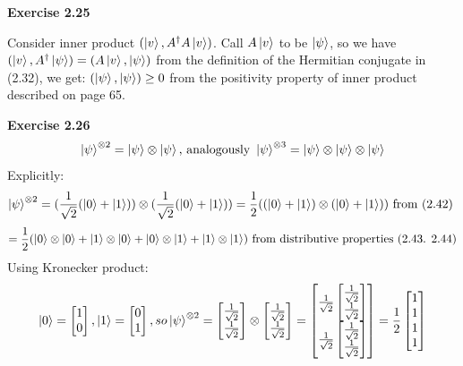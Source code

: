 \documentclass{article}
\begin{document}
\bigskip

\begin{framed}
    \noindent \textbf{Exercise 2.25}
    
    \medskip
    Consider inner product $(\ket{v}, A^{\dagger}A\ket{v})$. Call $A\ket{v}$ to be $\ket{\psi}$, so we have $(\ket{v}, A^{\dagger}\ket{\psi}) = (A\ket{v}, \ket{\psi})$ from the definition of the Hermitian conjugate in (2.32), we get: $(\ket{\psi}, \ket{\psi}) \geq 0$ from the positivity property of inner product described on page 65.
    
\end{framed}

\bigskip

\begin{framed}
    \noindent \textbf{Exercise 2.26}
    $$\ket{\psi}^{\otimes2} = \ket{\psi} \otimes \ket{\psi} \text{, analogously } \ket{\psi}^{\otimes3} = \ket{\psi} \otimes \ket{\psi} \otimes \ket{\psi}$$
    Explicitly: 
    $$
    \ket{\psi}^{\otimes2} = (\frac{1}{\sqrt{2}}(\ket{0} + \ket{1})) \otimes (\frac{1}{\sqrt{2}}(\ket{0} + \ket{1})) = \frac{1}{2}((\ket{0} + \ket{1}) \otimes (\ket{0} + \ket{1})) \text{ from (2.42) }
    $$
    $$
    = \frac{1}{2}(\ket{0} \otimes \ket{0} + \ket{1} \otimes \ket{0} + \ket{0} \otimes \ket{1} + \ket{1} \otimes \ket{1}) \text{ from distributive properties (2.43. 2.44)}
    $$
    Using Kronecker product:
    $$
     \ket{0} = \begin{bmatrix}1 \\ 0\end{bmatrix}, \ket{1} = \begin{bmatrix}0 \\ 1\end{bmatrix}, so \ket{\psi}^{\otimes2} = \begin{bmatrix} \frac{1}{\sqrt{2}} \\ \frac{1}{\sqrt{2}}\end{bmatrix} \otimes \begin{bmatrix}\frac{1}{\sqrt{2}} \\ \frac{1}{\sqrt{2}}\end{bmatrix} = \begin{bmatrix}\frac{1}{\sqrt{2}}\begin{bmatrix}\frac{1}{\sqrt{2}} \\ \frac{1}{\sqrt{2}}\end{bmatrix} \\ \frac{1}{\sqrt{2}}\begin{bmatrix}\frac{1}{\sqrt{2}} \\ \frac{1}{\sqrt{2}}\end{bmatrix}\end{bmatrix} = \frac{1}{2}\begin{bmatrix}1 \\ 1\\ 1\\ 1\end{bmatrix}
$$
\end{framed}
\end{document}
